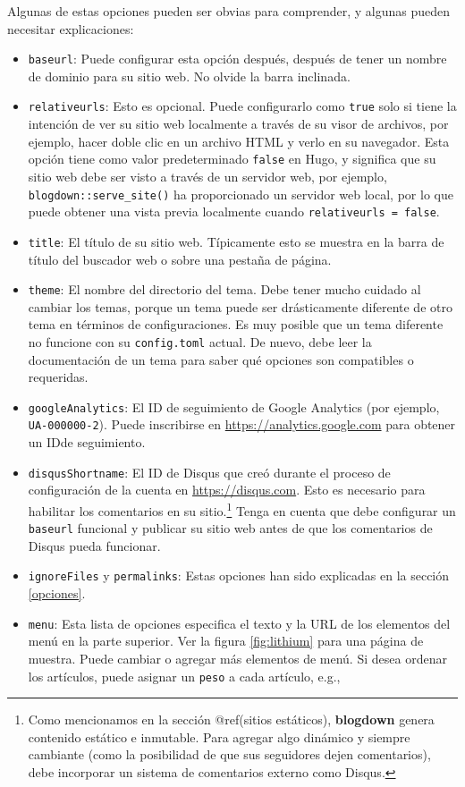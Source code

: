 \documentclass[12pt,]{krantz}
\theoremstyle{definition}
\theoremstyle{definition}
\theoremstyle{definition}
\theoremstyle{remark}
\begin{document}
Algunas de estas opciones pueden ser obvias para comprender, y algunas
pueden necesitar explicaciones:

\begin{itemize}
\item
  \texttt{baseurl}: Puede configurar esta opción después,
  después de tener un nombre de dominio para su sitio web. No olvide la
  barra inclinada.
\item
  \texttt{relativeurls}: Esto es opcional. Puede configurarlo como
  \texttt{true} solo si tiene la intención de ver su sitio web
  localmente a través de su visor de archivos, por ejemplo, hacer doble
  clic en un archivo HTML y verlo en su navegador. Esta opción tiene
  como valor predeterminado \texttt{false} en Hugo, y significa que su
  sitio web debe ser visto a través de un servidor web, por ejemplo,
  \texttt{blogdown::serve\_site()} ha proporcionado un servidor web
  local, por lo que puede obtener una vista previa localmente cuando
  \texttt{relativeurls\ =\ false}.
\item
  \texttt{title}: El título de su sitio web. Típicamente esto se muestra
  en la barra de título del buscador web o sobre una pestaña de página.
\item
  \texttt{theme}: El nombre del directorio del tema. Debe tener mucho
  cuidado al cambiar los temas, porque un tema puede ser drásticamente
  diferente de otro tema en términos de configuraciones. Es muy posible
  que un tema diferente no funcione con su \texttt{config.toml} actual.
  De nuevo, debe leer la documentación de un tema para saber qué
  opciones son compatibles o requeridas.
\item
  \texttt{googleAnalytics}: El ID de seguimiento de Google
  Analytics (por ejemplo, \texttt{UA-000000-2}).
  Puede inscribirse en \url{https://analytics.google.com} para obtener
  un IDde seguimiento.
\item
  \texttt{disqusShortname}: El ID de Disqus
  que creó durante el proceso de configuración de la cuenta en
  \url{https://disqus.com}. Esto es necesario para habilitar los
  comentarios en su sitio.\footnote{Como mencionamos en la sección
    @ref(sitios estáticos), \textbf{blogdown} genera contenido estático
    e inmutable. Para agregar algo dinámico y siempre cambiante (como la
    posibilidad de que sus seguidores dejen comentarios), debe
    incorporar un sistema de comentarios externo como Disqus.} Tenga en
  cuenta que debe configurar un \texttt{baseurl} funcional y publicar su
  sitio web antes de que los comentarios de Disqus pueda funcionar.
\item
  \texttt{ignoreFiles} y \texttt{permalinks}: Estas opciones han sido
  explicadas en la sección \ref{opciones}.
\item
  \texttt{menu}: Esta lista de opciones especifica el texto y la URL de
  los elementos del menú en la parte superior. Ver la figura
  \ref{fig:lithium} para una página de muestra. Puede cambiar o agregar
  más elementos de menú. Si desea ordenar los artículos, puede asignar
  un \texttt{peso} a cada artículo, e.g.,


\end{itemize}
\end{document}

